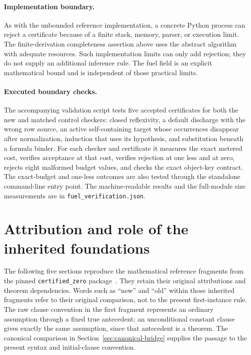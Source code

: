 \documentclass[11pt,a4paper]{article}
\theoremstyle{definition}\newtheorem{definition}[theorem]{Definition}
\theoremstyle{remark}\newtheorem{remark}[theorem]{Remark}
\begin{document}
\paragraph{Implementation boundary.}
As with the unbounded reference implementation, a concrete Python process
can reject a certificate because of a finite stack, memory, parser, or
execution limit. The finite-derivation completeness assertion above uses
the abstract algorithm with adequate resources. Such implementation limits
can only add rejection; they do not supply an additional inference rule.
The fuel field is an explicit mathematical bound and is independent of
those practical limits.

\paragraph{Executed boundary checks.}
The accompanying validation script tests five accepted certificates for
both the new and matched control checkers: closed reflexivity, a default
discharge with the wrong row source, an active self-containing target whose
occurrences disappear after normalization, induction that uses its
hypothesis, and substitution beneath a formula binder. For each checker
and certificate it measures the exact metered cost, verifies acceptance at
that cost, verifies rejection at one less and at zero, rejects eight
malformed budget values, and checks the exact object-key contract. The
exact-budget and one-less outcomes are also tested through the standalone
command-line entry point. The machine-readable results and the full-module
size measurements are in \texttt{fuel\_verification.json}.


\clearpage
\appendix
\section*{Attribution and role of the inherited foundations}

The following five sections reproduce the mathematical reference fragments
from the pinned \texttt{certified\_zero} package~\cite{baseline}.
They retain their original attributions and theorem dependencies.
Words such as ``new'' and ``old'' within those inherited fragments refer
to their original comparison, not to the present first-instance rule.
The raw clause convention in the first fragment represents an ordinary
assumption through a fixed true antecedent; an unconditional constant
clause gives exactly the same assumption, since that antecedent is a
theorem. The canonical comparison in
Section~\ref{sec:canonical-bridge} supplies the passage to the present
syntax and initial-clause convention.
\end{document}
